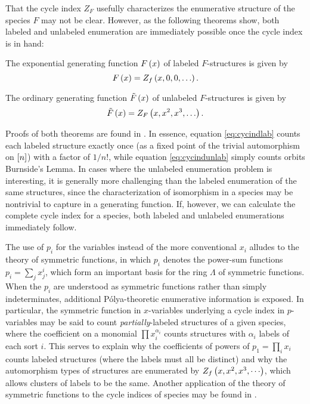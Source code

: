 \documentclass[sectionflow,singlespace,twoside,boldmathhdr]{brandiss} %
\numberwithin{section}{chapter}
\numberwithin{figure}{chapter}
\begin{document}
That the cycle index $Z_{F}$ usefully characterizes the enumerative structure of the species $F$ may not be clear.
However, as the following theorems show, both labeled and unlabeled enumeration are immediately possible once the cycle index is in hand:
\begin{theorem}\label{thm:cycindlab}
  The exponential generating function $F \left( {x} \right)$ of labeled $F$-structures is given by
  \begin{equation}\label{eq:cycindlab}
    F \left( {x} \right) = Z_{f} \left( {x, 0, 0, \dots} \right).
  \end{equation}
\end{theorem}
\begin{theorem}\label{thm:cycindunlab}
  The ordinary generating function $\tilde{F} \left( {x} \right)$ of unlabeled $F$-structures is given by
  \begin{equation}\label{eq:cycindunlab}
    \tilde{F} \left( {x} \right) = Z_{F} \left( {x, x^{2}, x^{3}, \dots} \right).
  \end{equation}
\end{theorem}
Proofs of both theorems are found in \cite[\S 1.2]{bll:species}.
In essence, equation \eqref{eq:cycindlab} counts each labeled structure exactly once (as a fixed point of the trivial automorphism on $\left[ {n} \right]$) with a factor of $1/n!$, while equation \eqref{eq:cycindunlab} simply counts orbits  Burnside's Lemma.
In cases where the unlabeled enumeration problem is interesting, it is generally more challenging than the labeled enumeration of the same structures, since the characterization of isomorphism in a species may be nontrivial to capture in a generating function.
If, however, we can calculate the complete cycle index for a species, both labeled and unlabeled enumerations immediately follow.

The use of $p_{i}$ for the variables instead of the more conventional $x_{i}$ alludes to the theory of symmetric functions, in which $p_{i}$ denotes the power-sum functions $p_{i} = \sum_{j} x_{j}^{i}$, which form an important basis for the ring $\Lambda$ of symmetric functions.
When the $p_{i}$ are understood as symmetric functions rather than simply indeterminates, additional P\'{o}lya-theoretic enumerative information is exposed.
In particular, the symmetric function in $x$-variables underlying a cycle index in $p$-variables may be said to count \emph{partially}-labeled structures of a given species, where the coefficient on a monomial $\prod x_{i}^{\alpha_{i}}$ counts structures with $\alpha_{i}$ labels of each sort $i$.
This serves to explain why the coefficients of powers of $p_{1} = \prod_{i} x_{i}$ counts labeled structures (where the labels must all be distinct) and why the automorphism types of structures are enumerated by $Z_{f} \left( {x, x^{2}, x^{3}, \cdots} \right)$, which allows clusters of labels to be the same.
Another application of the theory of symmetric functions to the cycle indices of species may be found in \cite{gessel:laginvspec}.
\end{document}
